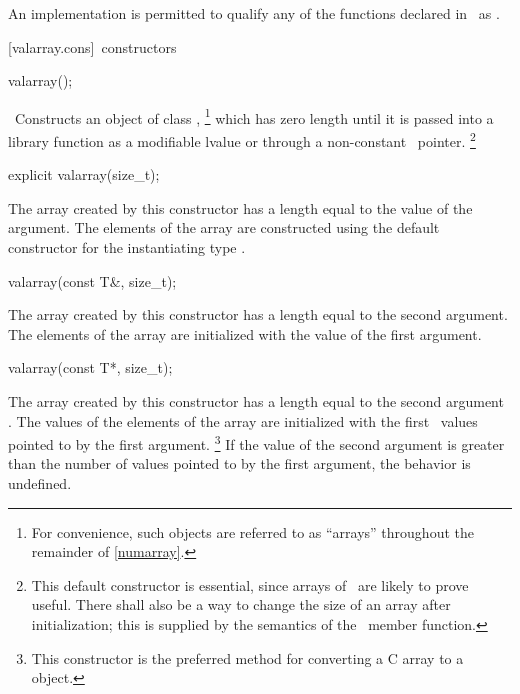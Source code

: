 \documentclass[american,twoside]{book}
\begin{document}
\begin{paras}
\pnum
An implementation is permitted to qualify any of the functions declared in
\
as
.

[valarray.cons]{\ constructors}

%
\begin{itemdecl}
valarray();
\end{itemdecl}

\begin{itemdescr}
\pnum
\effects\ 
Constructs an object of class
,%
\footnote{
For convenience, such objects are referred to as ``arrays'' throughout the
remainder of \ref{numarray}.
}
which has zero length until it is passed into a library function as a
modifiable lvalue or through a non-constant
\tcode{this}\
pointer.%
\footnote{
This default constructor is essential,
since arrays of
\
are likely to prove useful.
There shall also be a way to change the size of an array after
initialization; this is supplied by the semantics of the
\tcode{resize}\
member function.
}
\end{itemdescr}

\begin{itemdecl}
explicit valarray(size_t);
\end{itemdecl}

\begin{itemdescr}
\pnum
The array created by this constructor has a length equal to the value of the argument.
The elements of the array are constructed using the default constructor for the
instantiating type \farg{T}.
\end{itemdescr}

\begin{itemdecl}
valarray(const T&, size_t);
\end{itemdecl}

\begin{itemdescr}
\pnum
The array created by this constructor has a length equal to the second
argument.
The elements of the array are initialized with the value of the first argument.
\end{itemdescr}

\begin{itemdecl}
valarray(const T*, size_t);
\end{itemdecl}

\begin{itemdescr}
\pnum
The array created by this constructor has a length equal to the second
argument
.
The values of the elements of the array are initialized with the
first
\tcode{n}\
values pointed to by the first argument.%
\footnote{
This constructor is the preferred method for converting a C array to a
\tcode{valarray}
object.
}
If the value of the second argument is greater than the number of values
pointed to by the first argument, the behavior is undefined.%
\index{undefined}
\end{itemdescr}


\end{paras}
\end{document}
